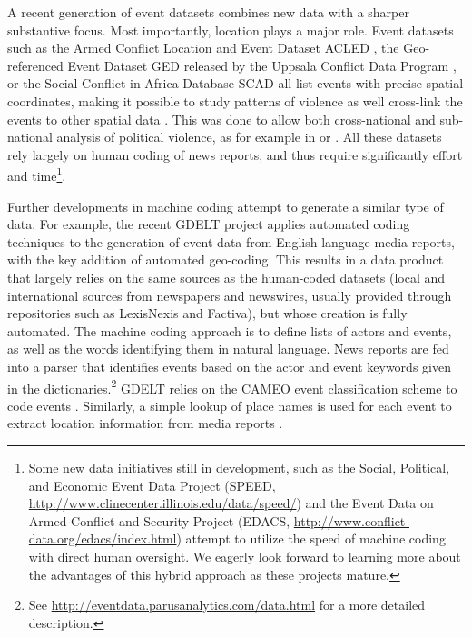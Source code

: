 \documentclass[hidelinks]{article}
\begin{document}
A recent generation of event datasets combines new data with a sharper substantive focus. Most importantly, location plays a major role. Event datasets such as the Armed Conflict Location and Event Dataset ACLED \citep{raleigh10acled}, the Geo-referenced Event Dataset GED released by the Uppsala Conflict Data Program \citep{sundberg13introducing}, or the Social Conflict in Africa Database SCAD \citep{salehyan12social} all list events with precise spatial coordinates, making it possible to study patterns of violence as well cross-link the events to other spatial data \citep{gleditsch12richardson}. This was done to allow both cross-national and sub-national analysis of political violence, as for example in \citet{raleigh09population} or \citet{weidmann10predicting}. All these datasets rely largely on human coding of news reports, and thus require significantly effort and time\footnote{Some new data initiatives still in development, such as the Social, Political, and Economic Event Data Project (SPEED, \url{http://www.clinecenter.illinois.edu/data/speed/}) and the Event Data on Armed Conflict and Security Project (EDACS, \url{http://www.conflict-data.org/edacs/index.html}) attempt to utilize the speed of machine coding with direct human oversight. We eagerly look forward to learning more about the advantages of this hybrid approach as these projects mature.}.

Further developments in machine coding attempt to generate a similar type of data. For example, the recent GDELT project applies automated coding techniques to the generation of event data from English language media reports, with the key addition of automated geo-coding. This results in a data product that largely relies on the same sources as the human-coded datasets (local and international sources from newspapers and newswires, usually provided through repositories such as LexisNexis and Factiva), but whose creation is fully automated. The machine coding approach is to define lists of actors and events, as well as the words identifying them in natural language. News reports are fed into a parser that identifies events based on the actor and event keywords given in the dictionaries.\footnote{See \url{http://eventdata.parusanalytics.com/data.html} for a more detailed description.} GDELT relies on the CAMEO event classification scheme to code events \citep{gerner02cameo}. Similarly, a simple lookup of place names is used for each event to extract location information from media reports \citep{leetaru13gdelt}. 
\end{document}
